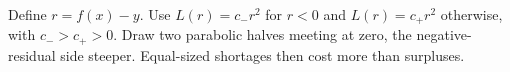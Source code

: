 Define \(r=f(x)-y\). Use \(L(r)=c_-r^2\) for \(r<0\) and \(L(r)=c_+r^2\) otherwise, with \(c_->c_+>0\). Draw two parabolic halves meeting at zero, the negative-residual side steeper. Equal-sized shortages then cost more than surpluses.
